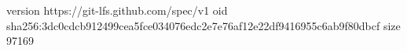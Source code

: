 version https://git-lfs.github.com/spec/v1
oid sha256:3dc0cdcb912499cea5fce034076edc2e7e76af12e22df9416955c6ab9f80dbcf
size 97169

